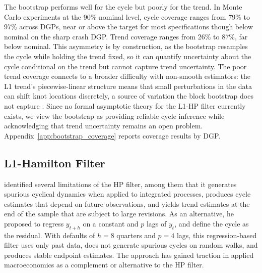 \documentclass[10pt]{article}
\begin{document}
The bootstrap performs well for the cycle but poorly for the trend. In Monte Carlo experiments at the 90\% nominal level, cycle coverage ranges from 79\% to 97\% across DGPs, near or above the target for most specifications though below nominal on the sharp crash DGP. Trend coverage ranges from 26\% to 87\%, far below nominal. This asymmetry is by construction, as the bootstrap resamples the cycle while holding the trend fixed, so it can quantify uncertainty about the cycle conditional on the trend but cannot capture trend uncertainty. The poor trend coverage connects to a broader difficulty with non-smooth estimators: the L1 trend's piecewise-linear structure means that small perturbations in the data can shift knot locations discretely, a source of variation the block bootstrap does not capture \citep{knight1998}. Since no formal asymptotic theory for the L1-HP filter currently exists, we view the bootstrap as providing reliable cycle inference while acknowledging that trend uncertainty remains an open problem. Appendix~\ref{app:bootstrap_coverage} reports coverage results by DGP.

\subsection{L1-Hamilton Filter}
\label{sec:l1hamilton}

\citet{hamilton2018} identified several limitations of the HP filter, among them that it generates spurious cyclical dynamics when applied to integrated processes, produces cycle estimates that depend on future observations, and yields trend estimates at the end of the sample that are subject to large revisions. As an alternative, he proposed to regress $y_{t+h}$ on a constant and $p$ lags of $y_t$, and define the cycle as the residual. With defaults of $h = 8$ quarters and $p = 4$ lags, this regression-based filter uses only past data, does not generate spurious cycles on random walks, and produces stable endpoint estimates. The approach has gained traction in applied macroeconomics as a complement or alternative to the HP filter.
\end{document}
